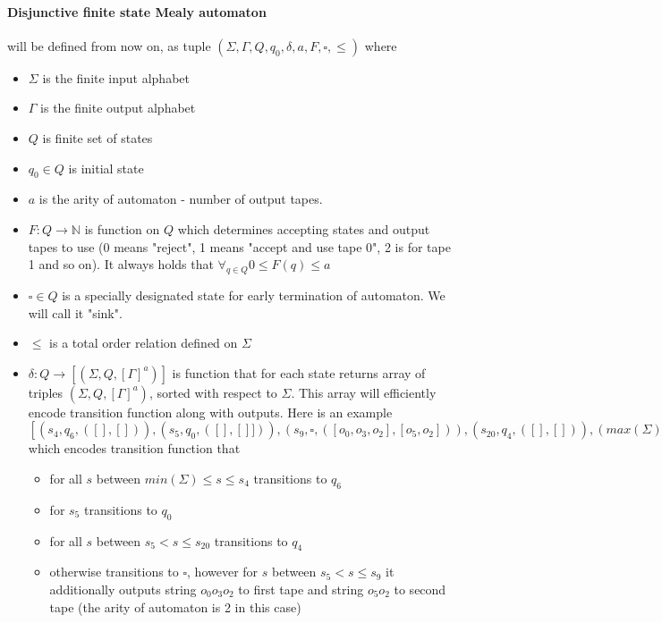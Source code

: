 \documentclass[12pt]{article}
\begin{document}
\paragraph{Disjunctive finite state Mealy automaton} will be defined from now on, as tuple $(\Sigma ,\Gamma ,  Q , q_0 , \delta , a , F , \square , \le )$ where 
\begin{itemize}
	\item $\Sigma$ is the finite input alphabet 
	\item $\Gamma$ is the finite output alphabet 
	\item $Q$ is finite set of states
	\item $q_0 \in Q$ is initial state
	\item $a$ is the arity of automaton - number of output tapes.
	\item $F : Q \rightarrow \mathbb{N}$ is function on $Q$ which determines accepting states and output tapes to use (0 means "reject", 1 means "accept and use tape 0", 2 is for tape 1 and so on). It always holds that $\forall_{q\in Q}0\le F(q)\le a$
	\item $\square \in Q$ is a specially designated state for early termination of automaton. We will call it "sink".
	\item $\le$ is a total order relation defined on $\Sigma$
	\item $\delta : Q \rightarrow [ (\Sigma , Q , [ \Gamma ]^a ) ]$ is function that for each state returns array of triples $(\Sigma , Q ,[\Gamma ]^a)$, sorted with respect to  $\Sigma$. This array will efficiently encode transition function along with outputs. Here is an example \\
	$[ (s_4,q_6,([],[])),(s_5,q_0,([],[]]) ),(s_9,\square,([  o_0 , o_3, o_2 ],[o_5,o_2]) ),(s_{20},q_4,([],[]) ),(max(\Sigma),\square,([],[]) ) ]$ \\
	which encodes transition function that
	\begin{itemize}
		\item for all $s$ between $min(\Sigma) \le s  \le s_4$ transitions to $q_6$ 
		\item for  $s_5$ transitions to $q_0$
		\item for all $s$ between  $s_{5} < s \le s_{20}$ transitions to $q_4$
		\item otherwise transitions to $\square$, however for $s$ between $s_5 < s \le s_9$ it additionally outputs string $o_0o_3o_2$ to first tape and string $o_5o_2$ to second tape (the arity of automaton is 2 in this case)
	\end{itemize} 
\end{itemize}
\end{document}
